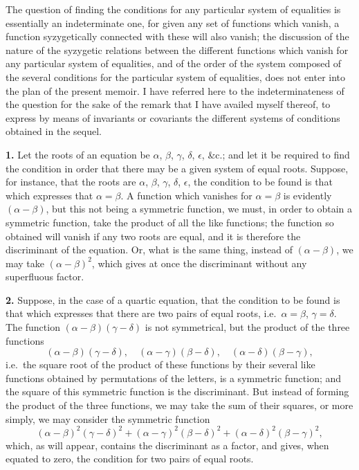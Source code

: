 \documentclass[11pt,a4paper]{book}
\begin{document}
\begin{center}
The question of finding the conditions for any particular system of equalities
is essentially an indeterminate one, for given any set of functions which
vanish, a function syzygetically connected with these will also vanish; the
discussion of the nature of the syzygetic relations between the different
functions which vanish for any particular system of equalities, and of the
order of the system composed of the several conditions for the particular
system of equalities, does not enter into the plan of the present memoir.
I have referred here to the indeterminateness of the question for the sake of
the remark that I have availed myself thereof, to express by means of
invariants or covariants the different systems of conditions obtained in the
sequel.

\textbf{1.} Let the roots of an equation be $\alpha$, $\beta$, $\gamma$,
$\delta$, $\epsilon$, \&c.; and let it be required to find the condition in
order that there may be a given system of equal roots. Suppose, for instance,
that the roots are $\alpha$, $\beta$, $\gamma$, $\delta$, $\epsilon$, the
condition to be found is that which expresses that $\alpha = \beta$. A
function which vanishes for $\alpha = \beta$ is evidently
$(\alpha - \beta)$, but this not being a symmetric function, we must, in
order to obtain a symmetric function, take the product of all the like
functions; the function so obtained will vanish if any two roots are equal,
and it is therefore the discriminant of the equation. Or, what is the same
thing, instead of $(\alpha - \beta)$, we may take $(\alpha - \beta)^2$,
which gives at once the discriminant without any superfluous factor.

\textbf{2.} Suppose, in the case of a quartic equation, that the condition to
be found is that which expresses that there are two pairs of equal roots,
i.e.\ $\alpha = \beta$, $\gamma = \delta$. The function
$(\alpha - \beta)(\gamma - \delta)$ is not symmetrical, but the product of
the three functions
\[
(\alpha - \beta)(\gamma - \delta), \quad
(\alpha - \gamma)(\beta - \delta), \quad
(\alpha - \delta)(\beta - \gamma),
\]
i.e.\ the square root of the product of these functions by their several
like functions obtained by permutations of the letters, is a symmetric
function; and the square of this symmetric function is the discriminant. But
instead of forming the product of the three functions, we may take the sum of
their squares, or more simply, we may consider the symmetric function
\[
(\alpha - \beta)^2 (\gamma - \delta)^2
+ (\alpha - \gamma)^2 (\beta - \delta)^2
+ (\alpha - \delta)^2 (\beta - \gamma)^2,
\]
which, as will appear, contains the discriminant as a factor, and gives, when
equated to zero, the condition for two pairs of equal roots.


\end{center}
\end{document}
